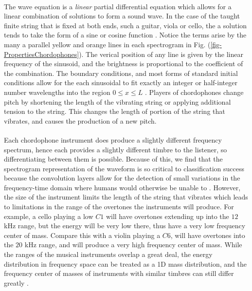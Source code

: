 \documentclass[12pt,letterpaper]{article}
\begin{document}
\paragraph*{}The wave equation is a \textit{linear} partial differential equation which allows for a linear combination of solutions to form a sound wave. In the case of the taught finite string that is fixed at both ends, such a guitar, viola or cello, the a solution tends to take the form of a sine or cosine function \cite{Hunter, Taylor, White}. Notice the terms arise by the many a parallel yellow and orange lines in each spectrogram in Fig. (\ref{fig-PropertiesChordophones}). The verical position of any line is given by the linear frequency of the sinusoid, and the brightness is proportional to the coefficient of the combination. The boundary conditions, and most forms of standard initial conditions allow for the each sinusoidal to fit exactly an integer or half-integer number wavelengths into the region $0 \leq x \leq L$ \cite{Haberman,Hunter}. Players of chordophones change pitch by shortening the length of the vibrating string or applying additional tension to the string. This changes the length of portion of the string that vibrates, and causes the production of a new pitch.

\paragraph*{}Each chordophone instrument does produce a slightly different frequency spectrum, hence each provides a slightly different timbre to the listener, so differentiating between them is possible. Because of this, we find that the spectrogram representation of the waveform is so critical to classification success because the convolution layers allow for the detection of small variations in the frequency-time domain where humans would otherwise be unable to \cite{Loy,Virtanen}. However, the size of the instrument limits the length of the string that vibrates which leads to limitations in the range of the overtones the instruments will produce. For example, a cello playing a low $C1$ will have overtones extending up into the $12$ kHz range, but the energy will be very low there, thus have a very low frequency center of mass. Compare this with a violin playing a $C6$, will have overtones into the $20$ kHz range, and will produce a very high frequency center of mass. While the ranges of the musical instruments overlap a great deal, the energy distribution in frequency space can be treated as a 1D mass distribution, and the frequency center of masses of instruments with similar timbres can still differ greatly \cite{Serizel}.
\end{document}
